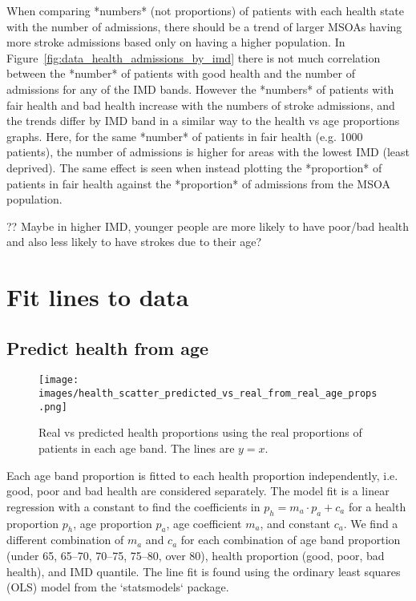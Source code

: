 \documentclass[12pt]{extarticle}
\begin{document}
When comparing *numbers* (not proportions) of patients with each health state with the number of admissions, there should be a trend of larger MSOAs having more stroke admissions based only on having a higher population.
In Figure~\ref{fig:data_health_admissions_by_imd} there is not much correlation between the *number* of patients with good health and the number of admissions for any of the IMD bands.
However the *numbers* of patients with fair health and bad health increase with the numbers of stroke admissions, and the trends differ by IMD band in a similar way to the health vs age proportions graphs.
Here, for the same *number* of patients in fair health (e.g. 1000 patients), the number of admissions is higher for areas with the lowest IMD (least deprived).
The same effect is seen when instead plotting the *proportion* of patients in fair health against the *proportion* of admissions from the MSOA population.

?? Maybe in higher IMD, younger people are more likely to have poor/bad health and also less likely to have strokes due to their age?


\section{Fit lines to data}

\subsection{Predict health from age}


\begin{figure}
    \centering
    \texttt{[image: images/health\_scatter\_predicted\_vs\_real\_from\_real\_age\_props.png]}
    \caption{Real vs predicted health proportions using the real proportions of patients in each age band. The lines are $y=x$.}
    \label{fig:health_predicted_from_real_age_props}
\end{figure}

Each age band proportion is fitted to each health proportion independently, i.e. good, poor and bad health are considered separately.
The model fit is a linear regression with a constant to find the coefficients in $p_h = m_a \cdot p_a + c_a$ for a health proportion $p_h$, age proportion $p_a$, age coefficient $m_a$, and constant $c_a$.
We find a different combination of $m_a$ and $c_a$ for each combination of age band proportion (under 65, 65--70, 70--75, 75--80, over 80), health proportion (good, poor, bad health), and IMD quantile.
The line fit is found using the ordinary least squares (OLS) model from the `statsmodels` package.
\end{document}
